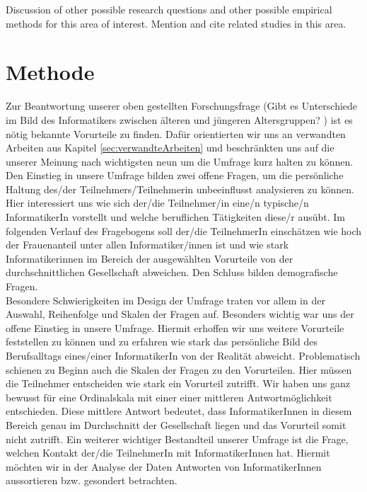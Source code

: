 \documentclass[de]{agse-empir-report}\usepackage[]{graphicx}\usepackage[]{color}
\begin{document}
Discussion of other possible research questions and other possible
empirical methods for this area of interest.
Mention and cite related studies in this area.



\section[jk]{Methode}\label{sec:methode}

Zur Beantwortung unserer oben gestellten Forschungsfrage (\glqq Gibt es Unterschiede im Bild des Informatikers zwischen älteren und jüngeren Altersgruppen? \grqq) ist es nötig bekannte Vorurteile zu finden. Dafür orientierten wir uns an verwandten Arbeiten aus Kapitel \ref{sec:verwandteArbeiten}  und beschränkten uns auf die unserer Meinung nach wichtigsten neun um die Umfrage kurz halten zu können. Den Einstieg in unsere Umfrage bilden zwei offene Fragen, um die persönliche Haltung des/der Teilnehmers/Teilnehmerin unbeeinflusst analysieren zu können. Hier interessiert uns wie sich der/die Teilnehmer/in eine/n typische/n InformatikerIn vorstellt und welche beruflichen Tätigkeiten diese/r ausübt. Im folgenden Verlauf des Fragebogens soll der/die TeilnehmerIn einschätzen wie hoch der Frauenanteil unter allen Informatiker/innen ist und wie stark Informatikerinnen im Bereich der ausgewählten Vorurteile von der durchschnittlichen Gesellschaft abweichen. Den Schluss bilden demografische Fragen. \\
Besondere Schwierigkeiten im Design der Umfrage traten vor allem in der Auswahl, Reihenfolge und Skalen der Fragen auf. Besonders wichtig war uns der offene Einstieg in unsere Umfrage. Hiermit erhoffen wir uns weitere Vorurteile feststellen zu können und zu erfahren wie stark das persönliche Bild des Berufsalltags eines/einer InformatikerIn von der Realität abweicht. Problematisch schienen zu Beginn auch die Skalen der Fragen zu den Vorurteilen. Hier müssen die Teilnehmer entscheiden wie stark ein Vorurteil zutrifft. Wir haben uns ganz bewusst für eine Ordinalskala mit einer einer mittleren Antwortmöglichkeit entschieden. Diese mittlere Antwort bedeutet, dass InformatikerInnen in diesem Bereich genau im Durchschnitt der Gesellschaft liegen und das Vorurteil somit nicht zutrifft. Ein weiterer wichtiger Bestandteil unserer Umfrage ist die Frage, welchen Kontakt der/die TeilnehmerIn mit InformatikerInnen hat. Hiermit möchten wir in der Analyse der Daten Antworten von InformatikerInnen aussortieren bzw. gesondert betrachten. \\
\end{document}
